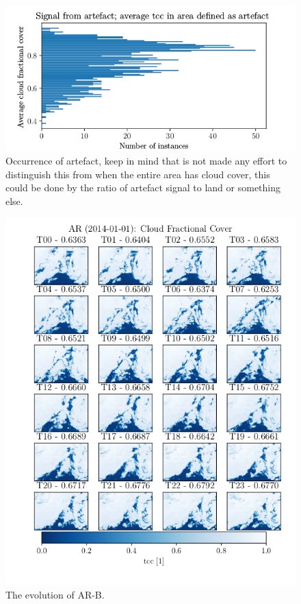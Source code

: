 \begin{figure}
    \centering
    \includegraphics{python_figs/signal_artefact.png}
    \caption{Occurrence of artefact, keep in mind that is not made any effort to distinguish this from when the entire area has cloud cover, this could be done by the ratio of artefact signal to land or something else. }
    \label{fig:signal_artefact}
\end{figure}
\begin{figure}
    \centering
    \includegraphics{python_figs/AR_timelapse_cloud_cover_24hrs_from_2014_01_01_base_on_one_hrERA5.png}
    \caption{The evolution of AR-B.}
    \label{fig:AR-B-sequenc-ERA5}
\end{figure}

